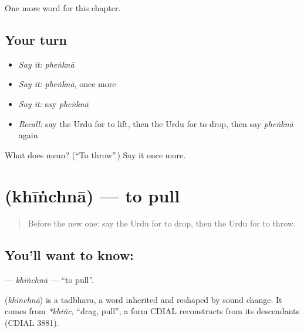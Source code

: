 \begin{grammarlens}[title={What you've built}]
One more word for this chapter.
\end{grammarlens}

\subsection*{Your turn}
\begin{itemize}
\raggedright
  \item \emph{Say it:} \emph{pheṅknā}
  \item \emph{Say it:} \emph{pheṅknā}, once more
  \item \emph{Say it:} say \emph{pheṅknā}
  \item \emph{Recall:} say the Urdu for to lift, then the Urdu for to drop, then say \emph{pheṅknā} again
\end{itemize}

\begin{tcolorbox}[breakable,colback=teal!4,colframe=teal!35!black,title={Before you move on}]
What does  mean? (\textquotedblleft{}To throw\textquotedblright{}.) Say it once more.
\end{tcolorbox}
\section[\texorpdfstring{\ur{کھینچنا} (khīṅchnā)}{کھینچنا (khīṅchnā)}]{ (khīṅchnā) — to pull}

\label{lesson:UR-C213-khinchna}



\begin{quote}
Before the new one: say the Urdu for to drop, then the Urdu for to throw.
\end{quote}

\subsection*{You'll want to know: }
\textbf{} — \emph{khīṅchnā} — \textquotedblleft{}to pull\textquotedblright{}.

\begin{cousinweb}
\textbf{} (\emph{khīṅchnā}) is a tadbhava, a word inherited and reshaped by sound change. It comes from \emph{*khiñc}, \textquotedblleft{}drag, pull\textquotedblright{}, a form CDIAL reconstructs from its descendants (CDIAL 3881).
\end{cousinweb}

